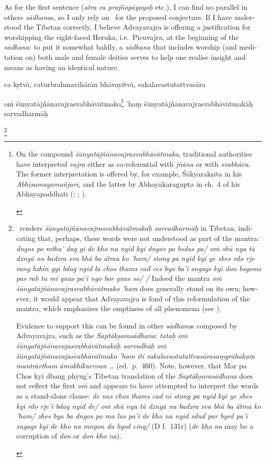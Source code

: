 \documentclass[naipra.tex]{subfiles}
\begin{document}
\begin{sanskrit}
{\begin{english}
	As for the first sentence (\emph{atra ca prajñopāyayoḥ} etc.), I can find no parallel in others \emph{sādhana}s, so I only rely on \TIB\ for the proposed conjecture. 
	If I have understood the Tibetan correctly, I believe Advayavajra is offering a justification for worshipping the eight-faced Heruka, i.e.\ Picuvajra, at the beginning of the \emph{sādhana}: to put it somewhat baldly, a \emph{sādhana} that includes worship (and meditation on) both male and female deities serves to help one realise insight and means as having an identical nature.
\end{english}} ca kṛtvā, caturbrahmavihārān bhāvayitvā, sakalavastutattvasāra \begin{mantra}oṁ śūnyatājñānavajrasvabhāvātmako\footnote{
	\begin{english}%
		On the compound \emph{śūnyatājñānavajrasvabhāvātmaka}, traditional authorities have interpreted \emph{vajra} either as co-referential with \emph{jñāna} or with \emph{svabhāva}.
		The former interpretation is offered by, for example, Śākyarakṣita in his \emph{Abhisamayamañjarī}, and the latter by Abhayākaragupta in ch.\ 4 of his Abhayapaddhati (\cite[239–40 n.\ 273, n.\ 277]{english2002}; \cite[292]{isaacson2007}; \cite[140, 234]{yang2014}).
	\end{english}
} 'haṃ śūnyatājñānavajrasvabhāvātmakāḥ sarvadharmāḥ\end{mantra}\footnote{\begin{english}
	\TIB\ renders \emph{śūnyatājñānavajrasvabhāvātmakāḥ sarvadharmāḥ} in Tibetan, indicating that, perhaps, these words were not understood as part of the mantra: \emph{dngos po mtha' dag gi de kho na nyid kyi dngos po bsdus pa/ oṁ shū nya tā dznyā na badzra sva bhā ba ātma ko 'ham/ stong pa nyid kyi ye shes rdo rje rang bzhin gyi bdag nyid la chos thams cad ces bya ba'i sngags kyi don bsgoms pas rab tu mi gnas pa'i ngo bor gnas so/ /}
	Indeed the mantra \emph{oṁ śūnyatājñānavajrasvabhāvātmako 'ham} does generally stand on its own; however, it would appear that Advayavajra is fond of this reformulation of the mantra, which emphasizes the emptiness of all phenomena (see \cite[128]{english2002}).

	Evidence to support this can be found in other \emph{sādhana}s composed by Advayavajra, such as the \emph{Saptākṣarasādhana}: \emph{tataḥ oṁ śūnyatājñānavajasvabhāvātmakāḥ sarvadhāḥ oṁ śūnyatājñānavajasvabhāvātmako 'ham iti sakalavastutattvasārasaṃgrāhakaṃ mantrārtham āmukhīkurvvan \ldots } (ed.\ p.\ 460).
	Note, however, that Mar pa Chos kyi dbang phyug's Tibetan translation of the \emph{Saptākṣarasādhana} does not reflect the first \emph{oṁ} and appears to have attempted to interpret the words as a stand-alone clause: \emph{de nas chos thams cad ni stong pa nyid kyi ye shes kyi rdo rje'i bdag nyid de/ oṁ shū nya tā dznyā na badzra sva bhā ba ātma ko 'ham/ zhes bya ba dngos po ma lus pa'i de kho na nyid sdud par byed pa'i sngags kyi de kho na mngon du byed cing/} (D f.\ 131r) (\emph{de kho na} may be a corruption of \emph{don} or \emph{don kho na}).


\end{english}}
\end{sanskrit}
\end{document}
